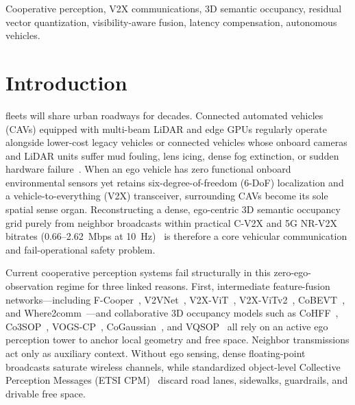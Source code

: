 \documentclass[journal]{IEEEtran}
\begin{document}
\begin{IEEEkeywords}
Cooperative perception, V2X communications, 3D semantic occupancy, residual vector quantization, visibility-aware fusion, latency compensation, autonomous vehicles.
\end{IEEEkeywords}

\section{Introduction}
\label{sec:intro}

 fleets will share urban roadways for decades. Connected automated vehicles (CAVs) equipped with multi-beam LiDAR and edge GPUs regularly operate alongside lower-cost legacy vehicles or connected vehicles whose onboard cameras and LiDAR units suffer mud fouling, lens icing, dense fog extinction, or sudden hardware failure~\cite{bijelic2020fog,kilic2021lisa,etsi2023cpm,bai2024survey}. When an ego vehicle has zero functional onboard environmental sensors yet retains six-degree-of-freedom (6-DoF) localization and a vehicle-to-everything (V2X) transceiver, surrounding CAVs become its sole spatial sense organ. Reconstructing a dense, ego-centric 3D semantic occupancy grid purely from neighbor broadcasts within practical C-V2X and 5G NR-V2X bitrates (0.66--2.62~Mbps at 10~Hz)~\cite{molina2024reeval} is therefore a core vehicular communication and fail-operational safety problem.

Current cooperative perception systems fail structurally in this zero-ego-observation regime for three linked reasons. First, intermediate feature-fusion networks---including F-Cooper~\cite{chen2019fcooper}, V2VNet~\cite{wang2020v2vnet}, V2X-ViT~\cite{xu2022v2xvit}, V2X-ViTv2~\cite{xu2025v2xvitv2}, CoBEVT~\cite{xu2022cobevt}, and Where2comm~\cite{hu2022where2comm}---and collaborative 3D occupancy models such as CoHFF~\cite{song2024cohff}, Co3SOP~\cite{wu2025co3sop}, VOGS-CP~\cite{chen2026vogscp}, CoGaussian~\cite{verma2026cogaussian}, and VQSOP~\cite{li2026vqsop} all rely on an active ego perception tower to anchor local geometry and free space. Neighbor transmissions act only as auxiliary context. Without ego sensing, dense floating-point broadcasts saturate wireless channels, while standardized object-level Collective Perception Messages (ETSI CPM)~\cite{etsi2023cpm} discard road lanes, sidewalks, guardrails, and drivable free space.
\end{document}
